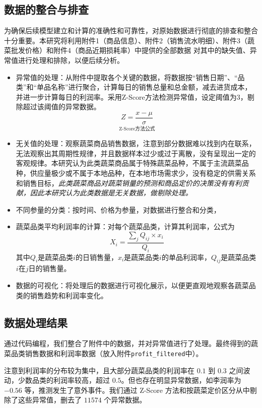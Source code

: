 \documentclass{article}
\begin{document}
\subsection{数据的整合与排查}
为确保后续模型建立和计算的准确性和可靠性，对原始数据进行彻底的排查和整合十分重要。本研究将利用附件1（商品信息）、附件2（销售流水明细）、附件3（蔬菜批发价格）和附件4（商品近期损耗率）中提供的全部数据
对其中的缺失值、异常值进行处理和排除，以便后续分析。
\begin{itemize}
    \item 异常值的处理：从附件中提取各个关键的数据，将数据按“销售日期”、“品类”和“单品名称”进行聚合，计算每日的销售总量和总金额，减去进货成本，并进一步计算每日的利润率。采用Z-Score方法检测异常值，设定阈值为3，剔除超过该阈值的异常数据。
    \[
\underset{\text{Z-Score方法公式}}{Z = \frac{x - \mu}{\sigma}}
\]

    \item 无关值的处理：观察蔬菜商品销售数据，注意到部分数据难以找到内在联系，无法观察出其周期性规律，并且数据样本过少或过于离散，没有呈现出一定的客观规律。本研究认为此类蔬菜商品属于特殊蔬菜品种，不属于主流蔬菜品种，供应量极少或不属于本地品种，在本地市场需求少，没有稳定的供需关系和销售目标，\textit{此类蔬菜商品对蔬菜销量的预测和商品定价的决策没有有利贡献，因此本研究认为此类数据是无关数据，做剔除处理。}
    
    \item 不同参量的分类：按时间、价格为参量，对数据进行整合和分类，
    
    \item 蔬菜品类平均利润率的计算：对每个蔬菜品类，计算其利润率，公式为
    \[
X_i = \frac{\sum_j Q_{ij} \times x_i}{Q_i}
\]
其中$ Q_i$是蔬菜品类$i$的日销售量，$x_i$是蔬菜品类$i$的单品利润率，$Q_{ij}$是蔬菜品类$i$在$j$日的销售量。
    
    \item 数据的可视化：将处理后的数据进行可视化展示，以便更直观地观察各蔬菜品类的销售趋势和利润率变化。
\end{itemize}

\subsection{数据处理结果}
通过代码编程，我们整合了附件中的数据，并对异常值进行了处理。最终得到的蔬菜品类销售数据和利润率数据（放入附件\texttt{profit\_filtered}中）。

注意到利润率的分布较为集中，且大部分蔬菜品类的利润率在 $0.1$ 到 $0.3$ 之间波动，少数品类的利润率较高，超过 $0.5$。但也存在明显异常数据，如李润率为 $-0.56$ 等，推测发生了意外事件。我们通过 Z-Score 方法和按蔬菜定价区分从中剔除了这些异常值，删去了 $11574$ 个异常数据。
\end{document}
